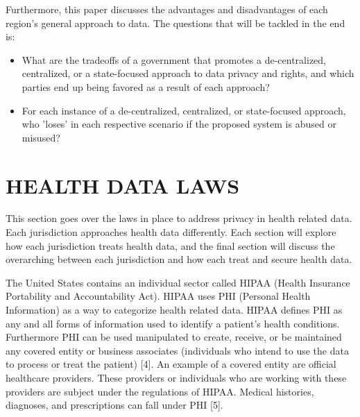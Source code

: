 \documentclass[conference]{IEEEtran}
\begin{document}
Furthermore, this paper discusses the advantages and disadvantages of each region's general approach to data. The questions that will be tackled in the end is:
\begin{itemize}
    \item What are the tradeoffs of a government that promotes a de-centralized, centralized, or a state-focused approach to data privacy and rights, and which parties end up being favored as a result of each approach?
    \item For each instance of a de-centralized, centralized, or state-focused approach, who 'loses' in each respective scenario if the proposed system is abused or misused?
\end{itemize}


\section{HEALTH DATA LAWS}


This section goes over the laws in place to address privacy in health related data. Each jurisdiction approaches health data differently. Each section will explore how each jurisdiction treats health data, and the final section will discuss the overarching between each jurisdiction and how each treat and secure health data.

The United States contains an individual sector called HIPAA (Health Insurance Portability and Accountability Act). HIPAA uses PHI (Personal Health Information) as a way to categorize health related data. HIPAA defines PHI as any and all forms of information used to identify a patient's health conditions. Furthermore PHI can be used manipulated to create, receive, or be maintained any covered entity or business associates (individuals who intend to use the data to process or treat the patient) [4]. An example of a covered entity are official healthcare providers. These providers or individuals who are working with these providers are subject under the regulations of HIPAA. Medical histories, diagnoses, and prescriptions can fall under PHI [5].
\end{document}
